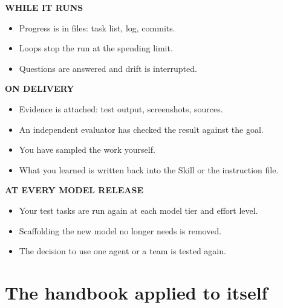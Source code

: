 \documentclass[11pt,letterpaper]{article}
\newcommand{\boxlabel}[1]{{\sffamily\footnotesize\bfseries\color{ink2} #1}}
\begin{document}
\vspace{0.3em}
\noindent\begin{minipage}[t]{0.47\textwidth}\raggedright
\boxlabel{WHILE IT RUNS}
\begin{itemize}[label=$\square$, leftmargin=1.5em, itemsep=0.25em]
  \item Progress is in files: task list, log, commits.
  \item Loops stop the run at the spending limit.
  \item Questions are answered and drift is interrupted.
\end{itemize}
\end{minipage}\hfill
\begin{minipage}[t]{0.47\textwidth}\raggedright
\boxlabel{ON DELIVERY}
\begin{itemize}[label=$\square$, leftmargin=1.5em, itemsep=0.25em]
  \item Evidence is attached: test output, screenshots, sources.
  \item An independent evaluator has checked the result against the goal.
  \item You have sampled the work yourself.
  \item What you learned is written back into the Skill or the instruction file.
\end{itemize}
\end{minipage}

\vspace{0.6em}
\noindent\begin{minipage}[t]{0.47\textwidth}\raggedright
\boxlabel{AT EVERY MODEL RELEASE}
\begin{itemize}[label=$\square$, leftmargin=1.5em, itemsep=0.25em]
  \item Your test tasks are run again at each model tier and effort level.
  \item Scaffolding the new model no longer needs is removed.
  \item The decision to use one agent or a team is tested again.
\end{itemize}
\end{minipage}\hfill
\begin{minipage}[t]{0.47\textwidth}\raggedright

\end{minipage}

\section{The handbook applied to itself}\label{sec:self}
\end{document}
